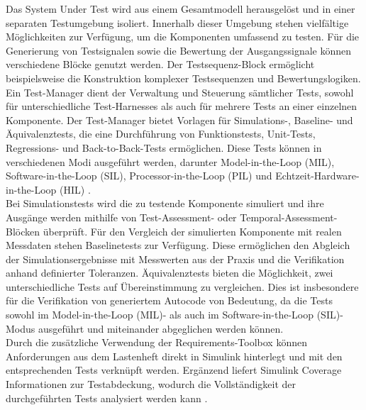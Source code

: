 Das System Under Test wird aus einem Gesamtmodell herausgelöst und in einer separaten Testumgebung isoliert. Innerhalb dieser Umgebung stehen vielfältige Möglichkeiten zur Verfügung, um die Komponenten umfassend zu testen. Für die Generierung von Testsignalen sowie die Bewertung der Ausgangssignale können verschiedene Blöcke genutzt werden. Der Testsequenz-Block ermöglicht beispielsweise die Konstruktion komplexer Testsequenzen und Bewertungslogiken.\\
Ein Test-Manager dient der Verwaltung und Steuerung sämtlicher Tests, sowohl für unterschiedliche Test-Harnesses als auch für mehrere Tests an einer einzelnen Komponente. Der Test-Manager bietet Vorlagen für Simulations-, Baseline- und Äquivalenztests, die eine Durchführung von Funktionstests, Unit-Tests, Regressions- und Back-to-Back-Tests ermöglichen. Diese Tests können in verschiedenen Modi ausgeführt werden, darunter Model-in-the-Loop (MIL), Software-in-the-Loop (SIL), Processor-in-the-Loop (PIL) und Echtzeit-Hardware-in-the-Loop (HIL) \cite{Simulink_Test_Toolbox}.\\
Bei Simulationstests wird die zu testende Komponente simuliert und ihre Ausgänge werden mithilfe von Test-Assessment- oder Temporal-Assessment-Blöcken überprüft. Für den Vergleich der simulierten Komponente mit realen Messdaten stehen Baselinetests zur Verfügung. Diese ermöglichen den Abgleich der Simulationsergebnisse mit Messwerten aus der Praxis und die Verifikation anhand definierter Toleranzen. Äquivalenztests bieten die Möglichkeit, zwei unterschiedliche Tests auf Übereinstimmung zu vergleichen. Dies ist insbesondere für die Verifikation von generiertem Autocode von Bedeutung, da die Tests sowohl im Model-in-the-Loop (MIL)- als auch im Software-in-the-Loop (SIL)-Modus ausgeführt und miteinander abgeglichen werden können.\\
Durch die zusätzliche Verwendung der Requirements-Toolbox können Anforderungen aus dem Lastenheft direkt in Simulink hinterlegt und mit den entsprechenden Tests verknüpft werden. Ergänzend liefert Simulink Coverage Informationen zur Testabdeckung, wodurch die Vollständigkeit der durchgeführten Tests analysiert werden kann \cite{Simulink_Test_Toolbox}.


